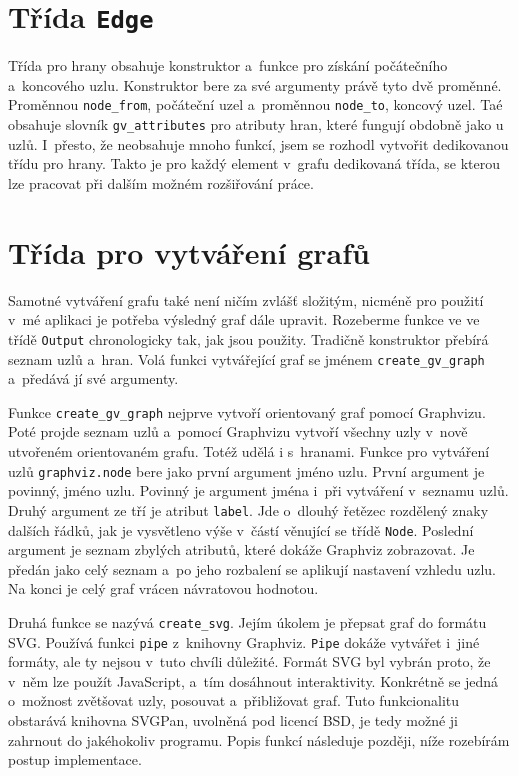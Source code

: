 \documentclass[printed,color,table,oneside,nolot,nolof]{fithesis}
\begin{document}
\section{Třída \texttt{Edge}}
	Třída pro hrany obsahuje konstruktor a~funkce pro získání počátečního a~koncového uzlu. Konstruktor bere za své argumenty právě tyto dvě 
	proměnné. Proměnnou \texttt{node\_from}, počáteční uzel a~proměnnou \texttt{node\_to}, koncový uzel. Taé obsahuje slovník \texttt{gv\_attributes} pro atributy hran, které fungují obdobně
	jako u uzlů. I~přesto, že neobsahuje mnoho funkcí, jsem se rozhodl vytvořit dedikovanou třídu pro hrany. 
	Takto je pro každý element v~grafu dedikovaná třída, se kterou lze pracovat při dalším možném rozšiřování práce.

\section{Třída pro vytváření grafů}
	Samotné vytváření grafu také není ničím zvlášť složitým, nicméně pro použití v~mé aplikaci je potřeba výsledný graf dále upravit. Rozeberme funkce ve ve třídě \texttt{Output} chronologicky
	tak, jak jsou použity. Tradičně konstruktor přebírá seznam uzlů a~hran. Volá funkci vytvářející graf se jménem \texttt{create\_gv\_graph} a~předává jí své argumenty. 

	Funkce \texttt{create\_gv\_graph} nejprve vytvoří orientovaný graf pomocí Graphvizu. Poté projde seznam uzlů a~pomocí Graphvizu vytvoří všechny uzly v~nově utvořeném orientovaném grafu. Totéž udělá i
	s~hranami. Funkce pro vytváření uzlů \texttt{graphviz.node} bere jako první argument jméno uzlu. První argument je povinný, jméno uzlu. Povinný je argument jména
	i~při vytváření v~seznamu uzlů. Druhý argument ze tří je atribut \texttt{label}. Jde o~dlouhý řetězec rozdělený znaky dalších řádků, jak je vysvětleno výše v~částí věnující se třídě \texttt{Node}.
	Poslední argument je seznam zbylých atributů, které dokáže Graphviz zobrazovat. Je předán jako celý seznam a~po jeho rozbalení se aplikují nastavení vzhledu uzlu. Na konci je celý
	graf vrácen návratovou hodnotou.

	Druhá funkce se nazývá \texttt{create\_svg}. Jejím úkolem je přepsat graf do formátu SVG. Používá funkci \texttt{pipe} z~knihovny Graphviz. \texttt{Pipe} dokáže vytvářet i~jiné formáty, ale ty nejsou v~tuto
	chvíli důležité. Formát SVG byl vybrán proto, že v~něm lze použít JavaScript\cite{svg}, a~tím dosáhnout interaktivity. Konkrétně se jedná o~možnost zvětšovat uzly, posouvat a~přibližovat graf.
	Tuto funkcionalitu obstarává knihovna SVGPan\cite{svgpan}, uvolněná pod licencí BSD, je tedy možné ji zahrnout do jakéhokoliv programu.
	Popis funkcí následuje později, níže rozebírám postup implementace.
\end{document}
